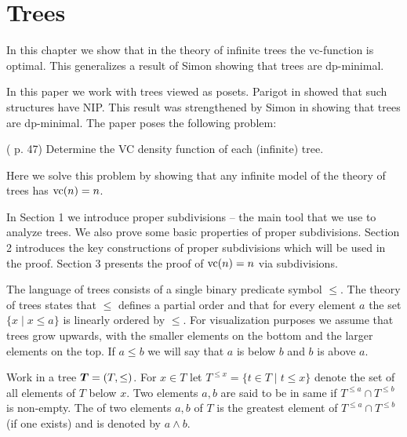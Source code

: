 \chapter{Trees}
In this chapter we show that in the theory of infinite trees the vc-function is optimal.
This generalizes a result of Simon showing that trees are dp-minimal. 

In this paper we work with trees viewed as posets.
Parigot in \cite{parigot_trees} showed that such structures have NIP.
This result was strengthened by Simon in \cite{simon_dp_min} showing that trees are dp-minimal.
The paper \cite{density} poses the following problem:

\begin{Problem} (\cite{density} p. 47)
  Determine the VC density function of each (infinite) tree.
\end{Problem}

Here we solve this problem by showing that any infinite model of the theory of trees has $\operatorname{vc}(n) = n$.

In Section 1 we introduce proper subdivisions -- the main tool that we use to analyze trees.
We also prove some basic properties of proper subdivisions.
Section 2 introduces the key constructions of proper subdivisions which will be used in the proof.
Section 3 presents the proof of $\operatorname{vc}(n) = n$ via subdivisions.

The language of trees consists of a single binary predicate symbol $\leq$. The theory of trees states that $\leq$ defines a partial order and that for every element $a$ the set $\{x \mid x \leq a\}$ is linearly ordered by $\leq$. For visualization purposes we assume that trees grow upwards, with the smaller elements on the bottom and the larger elements on the top. If $a \leq b$ we will say that $a$ is below $b$ and $b$ is above $a$.

\begin{Definition}
  Work in a tree $\operatorname{\boldsymbol T} = (T, \leq)$.
  For $x \in T$ let $T^{\leq x} = \{t \in T \mid t \leq x\}$ denote the set of all elements of $T$ below $x$.
  Two elements $a,b$ are said to be in same  if $T^{\leq a} \cap T^{\leq b}$ is non-empty.
  The  of two elements $a,b$ of $T$ is the greatest element of $T^{\leq a} \cap T^{\leq b}$ (if one exists) and is denoted by $a \wedge b$.
\end{Definition}

